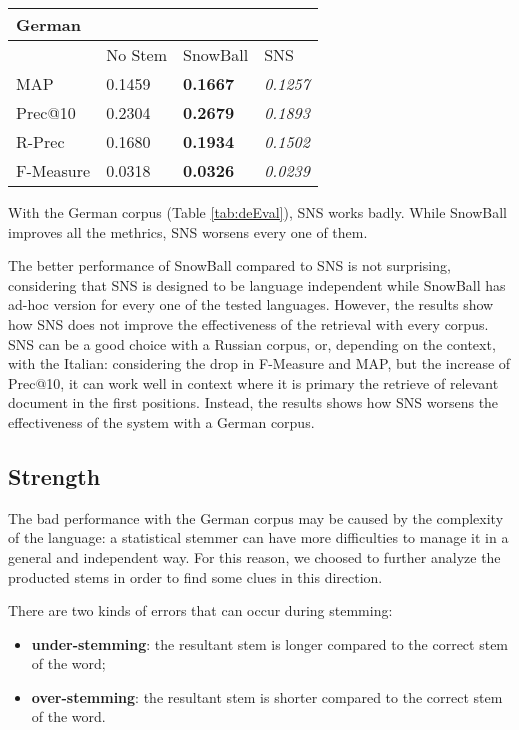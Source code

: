 \begin{center}
   \begin{tabular}{| l | l | l | l |}
    \hline
    \multicolumn{4}{|l|}{\textbf{German}}\\ \hline
    & No Stem & SnowBall & SNS\\ \hline
    MAP & 0.1459 & \textbf{0.1667} & \textit{0.1257} \\ \hline
    Prec@10 & 0.2304 & \textbf{0.2679} & \textit{0.1893} \\ \hline
    R-Prec & 0.1680 & \textbf{0.1934} & \textit{0.1502}\\ \hline
    F-Measure & 0.0318 & \textbf{0.0326} & \textit{0.0239}\\ \hline    
    \end{tabular}
    \label{tab:deEval}
\end{center}

With the German corpus (Table \ref{tab:deEval}), SNS works badly. While SnowBall improves all the methrics, SNS worsens every one of them. 

The better performance of SnowBall compared to SNS is not surprising, considering that SNS is designed to be language independent while SnowBall has ad-hoc version for every one of the tested languages. However, the results show how SNS does not improve the effectiveness of the retrieval with every corpus. SNS can be a good choice with a Russian corpus, or, depending on the context, with the Italian: considering the drop in F-Measure and MAP, but the increase of Prec@10, it can work well in context where it is primary the retrieve of relevant document in the first positions. Instead, the results shows how SNS worsens the effectiveness of the system with a German corpus. 

\subsection{Strength}
The bad performance with the German corpus may be caused by the complexity of the language: a statistical stemmer can have more difficulties to manage it in a general and independent way. For this reason, we choosed to further analyze the producted stems in order to find some clues in this direction.

There are two kinds of errors that can occur during stemming:

\begin{itemize}
\item \textbf{under-stemming}: the resultant stem is longer compared to the correct stem of the word;
\item \textbf{over-stemming}: the resultant stem is shorter compared to the correct stem of the word.
\end{itemize}

